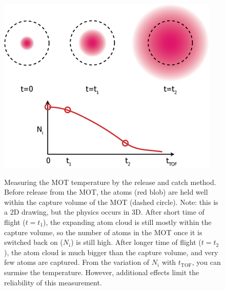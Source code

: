 \documentclass{../lab}
\begin{document}
\begin{figure}[h]
    \centering
    \href{http://experimentationlab.berkeley.edu/sites/default/files/images/400px-Release_catch.png}{\includegraphics[width=0.5\linewidth]{images/400px-Release_catch.png}}
    \caption{Measuring the MOT temperature by the release and catch method. Before release from the MOT, the atoms (red blob) are held well within the capture volume of the MOT (dashed circle). Note: this is a 2D drawing, but the physics occurs in 3D. After short time of flight ($t = t_1$), the expanding atom cloud is still mostly within the capture volume, so the number of atoms in the MOT once it is switched back on ($N_i$) is still high. After longer time of flight ($t = t_2$), the atom cloud is much bigger than the capture volume, and very few atoms are captured. From the variation of $N_i$ with $t_\text{TOF}$, you can surmise the temperature. However, additional effects limit the reliability of this measurement.}
    \label{fig:400px-Release_catch}
\end{figure}
\end{document}
